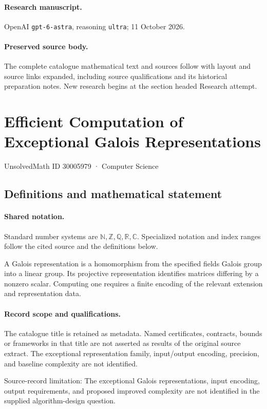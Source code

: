 \documentclass[11pt]{article}
\begin{document}
\paragraph{Research manuscript.} OpenAI \texttt{gpt-6-astra}, reasoning \texttt{ultra}; 11 October 2026.
\paragraph{Preserved source body.} The complete catalogue mathematical text and sources follow with layout and source links expanded, including source qualifications and its historical preparation notes. New research begins at the section headed Research attempt.

\section{Efficient Computation of Exceptional Galois Representations}\label{30005979}
{\small UnsolvedMath ID 30005979 · Computer Science}
\subsection{Definitions and mathematical statement}

\paragraph{Shared notation.}Standard number systems are $\mathbb N,\mathbb Z,\mathbb Q,\mathbb R,\mathbb C$. Specialized notation and index ranges follow the cited source and the definitions below.


A Galois representation is a homomorphism from the specified field\textquotesingle s Galois group into a linear group. Its projective representation identifies matrices differing by a nonzero scalar. Computing one requires a finite encoding of the relevant extension and representation data.
\paragraph{Record scope and qualifications.}
The catalogue title is retained as metadata. Named certificates, contracts, bounds or frameworks in that title are not asserted as results of the original source extract.
The exceptional representation family, input/output encoding, precision, and baseline complexity are not identified.

Source-record limitation: The exceptional Galois representations, input encoding, output requirements, and proposed improved complexity are not identified in the supplied algorithm-design question.
\end{document}
